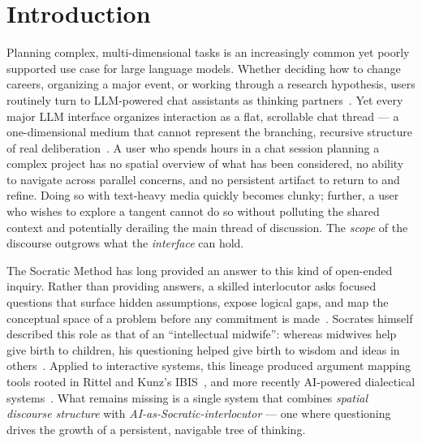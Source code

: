 \documentclass[sigconf]{acmart}
\begin{document}
\maketitle

\section{Introduction}
Planning complex, multi-dimensional tasks is an increasingly common yet poorly
supported use case for large language models. Whether deciding how to change careers,
organizing a major event, or working through a research hypothesis, users routinely
turn to LLM-powered chat assistants as thinking partners~\cite{collins2024thoughtpartners}.
Yet every major LLM interface organizes interaction as a flat, scrollable chat thread
--- a one-dimensional medium that cannot represent the branching, recursive structure
of real deliberation~\cite{lee2025criticalthinking}. A user who spends hours in a
chat session planning a complex project has no spatial overview of what has been
considered, no ability to navigate across parallel concerns, and no persistent artifact
to return to and refine. Doing so with text-heavy media quickly becomes clunky; further,
a user who wishes to explore a tangent cannot do so without polluting the shared context
and potentially derailing the main thread of discussion. The \textit{scope} of the
discourse outgrows what the \textit{interface} can hold.

The Socratic Method has long provided an answer to this kind of open-ended inquiry.
Rather than providing answers, a skilled interlocutor asks focused questions that
surface hidden assumptions, expose logical gaps, and map the conceptual space of a
problem before any commitment is made~\cite{toulmin1958argument, schon1983reflective}.
Socrates himself described this role as that of an ``intellectual midwife'': whereas
midwives help give birth to children, his questioning helped give birth to wisdom and
ideas in others~\cite{plato_theaetetus}. Applied to interactive systems, this lineage
produced argument mapping tools rooted in Rittel and Kunz's
IBIS~\cite{kunz1970ibis, rittel1973wicked}, and more recently AI-powered dialectical
systems~\cite{tanprasert2024debate, chiang2024devilsadvocate}. What remains missing
is a single system that combines \textit{spatial discourse structure} with
\textit{AI-as-Socratic-interlocutor} --- one where questioning drives the growth of
a persistent, navigable tree of thinking.
\end{document}

